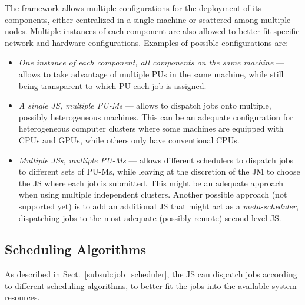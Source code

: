 \documentclass[runningheads,a4paper]{llncs}
\begin{document}
The framework allows multiple configurations for the deployment of its components, either centralized in a single machine or scattered among multiple nodes.
Multiple instances of each component are also allowed to better fit specific network and hardware configurations. Examples of possible configurations are:
\begin{itemize}
  \item \emph{One instance of each component, all components on the same machine} --- allows to take advantage of multiple PUs in the same machine, while still being transparent to which PU each job is assigned.
  \item \emph{A single JS, multiple PU-Ms} --- allows to dispatch jobs onto multiple, possibly heterogeneous machines. This can be an adequate configuration for heterogeneous computer clusters where some machines are equipped with CPUs and GPUs, while others only have conventional CPUs.
  \item \emph{Multiple JSs, multiple PU-Ms} --- allows different schedulers to dispatch jobs to different sets of PU-Ms, while leaving at the discretion of the JM to choose the JS where each job is submitted. This might be an adequate approach when using multiple independent clusters. Another possible approach (not supported yet) is to add an additional JS that might act as a \emph{meta-scheduler}, dispatching jobs to the most adequate (possibly remote) second-level JS. 
\end{itemize}

\subsection{Scheduling Algorithms}  
\label{sub:scheduling_algorithms}

As described in Sect.~\ref{subsub:job_scheduler}, the JS can dispatch jobs according to different scheduling algorithms, to better fit the jobs into the available system resources.

\end{document}
